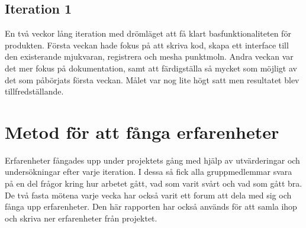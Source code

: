 \subsection{Iteration 1}

En två veckor lång iteration med drömläget att få klart basfunktionaliteten för produkten. Första veckan hade fokus på att skriva kod, skapa ett interface till den existerande mjukvaran, registrera och mesha punktmoln. Andra veckan var det mer fokus på dokumentation, samt att färdigställa så mycket som möjligt av det som påbörjats första veckan. Målet var nog lite högt satt men resultatet blev tillfredställande.

\section{Metod för att fånga erfarenheter}

Erfarenheter fångades upp under projektets gång med hjälp av utvärderingar och undersökningar efter varje iteration. I dessa så fick alla gruppmedlemmar svara på en del frågor kring hur arbetet gått, vad som varit svårt och vad som gått bra. De två fasta mötena varje vecka har också varit ett forum att dela med sig och fånga upp erfarenheter. Den här rapporten har också används för att samla ihop och skriva ner erfarenheter från projektet. 


